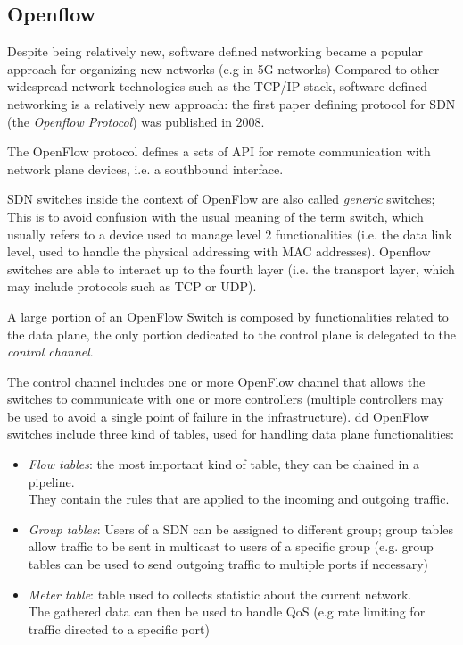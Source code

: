 \documentclass{report}
\begin{document}
	\subsection{Openflow}
	Despite being relatively new, software defined networking became a popular approach for organizing new networks (e.g in 5G networks)
	Compared to other widespread network technologies such as the TCP/IP stack, software defined networking is a relatively new approach: the first paper defining protocol for SDN (the \textit{Openflow Protocol}) was published in 2008.
	
	The OpenFlow protocol defines a sets of API for remote communication with network plane devices, i.e. a southbound interface.
	
	
	SDN switches inside the context of OpenFlow are also called \textit{generic} switches;
	This is to avoid confusion with the usual meaning of the term switch, which usually refers to a device used to manage level 2 functionalities (i.e. the data link level, used to handle the physical addressing with MAC addresses). 
	Openflow switches are able to interact up to the fourth layer (i.e. the transport layer, which may include protocols such as TCP or UDP).
	
	A large portion of an OpenFlow Switch is composed by functionalities related to the data plane, the only portion dedicated to the control plane is delegated to the \textit{control channel}.
	
	The control channel includes one or more OpenFlow channel that allows the switches to communicate with one or more controllers (multiple controllers may be used to avoid a single point of failure in the infrastructure).
	dd
	OpenFlow switches include three kind of tables, used for handling data plane functionalities:
	
	\begin{itemize}
		\item \textit{Flow tables}: the most important kind of table, they can be chained in a pipeline. \\
		They contain the rules that are applied to the incoming and outgoing traffic.
		\item \textit{Group tables}: Users of a SDN can be assigned to different group; group tables allow traffic to be sent in multicast to users of a specific group (e.g. group tables can be used to send outgoing traffic to multiple ports if necessary)
		\item \textit{Meter table}: table used to collects statistic about the current network. \\
		The gathered data can then be used to handle QoS (e.g rate limiting for traffic directed to a specific port)
	\end{itemize}
	 
\end{document}
